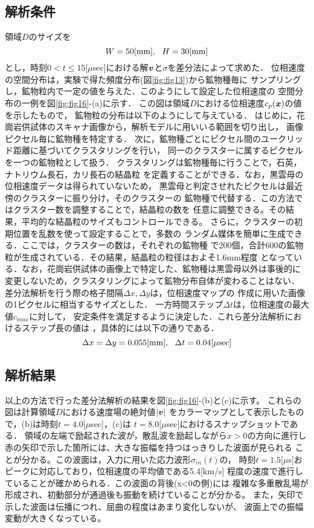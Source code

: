 \subsection{解析条件}
領域$D$のサイズを
\begin{equation}
	W=50[{\rm mm}], \ \  H=30[{\rm mm}]
	\label{eqn:dom_size}
\end{equation}
とし，時刻$ 0 <t\leq 15[\mu$sec]における解$\mbox{\boldmath{$v$}}$と$\sigma$を差分法によって求めた．
位相速度の空間分布は，実験で得た頻度分布(図\ref{fig:fig13})から鉱物種毎に
サンプリングし，鉱物粒内で一定の値を与えた．このようにして設定した位相速度の
空間分布の一例を図\ref{fig:fig16}-(a)に示す．
この図は領域$D$における位相速度$c_p(\mbox{\boldmath{$x$}})$の値を示したもので，
鉱物粒の分布は以下のようにして与えている．
はじめに，花崗岩供試体のスキャナ画像から，解析モデルに用いいる範囲を切り出し，
画像ピクセル毎に鉱物種を特定する．
次に，鉱物種ごとにピクセル間のユークリッド距離に基づいてクラスタリングを行い，
同一のクラスターに属するピクセルを一つの鉱物粒として扱う．
クラスタリングは鉱物種毎に行うことで，石英，ナトリウム長石，カリ長石の結晶粒
を定義することができる．なお，黒雲母の位相速度データは得られていないため，
黒雲母と判定させれたピクセルは最近傍のクラスターに振り分け，そのクラスターの
鉱物種で代替する．この方法ではクラスター数を調整することで，結晶粒の数を
任意に調整できる。その結果，平均的な結晶粒のサイズもコントロールできる。
さらに，クラスターの初期位置を乱数を使って設定することで，多数の
ランダム媒体を簡単に生成できる．ここでは，クラスターの数は，それぞれの鉱物種
で200個，合計600の鉱物粒が生成されている．その結果，結晶粒の粒径はおよそ1.6mm程度
となっている．なお，花崗岩供試体の画像上で特定した、鉱物種は黒雲母以外は事後的に
変更しないため，クラスタリングによって鉱物分布自体が変わることはない．
差分法解析を行う際の格子間隔$\Delta x, \Delta y$は，位相速度マップの
作成に用いた画像の1ピクセルに相当するサイズとした．
一方時間ステップ$\Delta t$は，位相速度の最大値$c_{max}$に対して，
安定条件を満足するように決定した．これら差分法解析におけるステップ長の値は
，具体的には以下の通りである．
\begin{equation}
	\Delta x = \Delta y= 0.055[{\rm mm}], \ \ \Delta t=0.04[\mu{\rm sec}]
	\label{eqn:}
\end{equation}
\subsection{解析結果}
以上の方法で行った差分法解析の結果を図\ref{fig:fig16}-(b)と(c)に示す。
これらの図は計算領域$D$における速度場の絶対値$\left| \mbox{\boldmath{$v$}}\right|$
をカラーマップとして表示したもので，(b)は時刻$t=4.0[\mu$sec]，(c)は
$t=8.0[\mu$sec]におけるスナップショットである．
領域の左端で励起された波が，散乱波を励起しながら$x>0$の方向に進行し
赤の矢印で示した箇所には、大きな振幅を持つはっきりした波面が見られる
ことが分かる。この波面は，入力に用いた応力波形$\sigma_{in}(t)$の，
時刻$t=1.5[\mu$s]おピークに対応しており，位相速度の平均値である5.4[km/s]
程度の速度で進行していることが確かめられる．この波面の背後(x<0の側)には
複雑な多重散乱場が形成され、初動部分が通過後も振動を続けていることが分かる。
また，矢印で示した波面は伝播につれ、屈曲の程度はあまり変化しないが、
波面上での振幅変動が大きくなっている。\\

